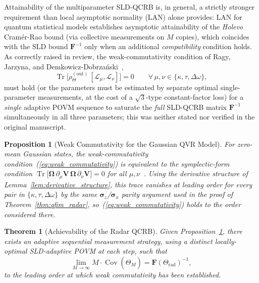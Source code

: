 \documentclass[journal]{IEEEtran}
\newtheorem{theorem}{Theorem}
\newtheorem{proposition}{Proposition}
\DeclareMathOperator{\Tr}{Tr}
\DeclareMathOperator{\Cov}{Cov}
\begin{document}
Attainability of the multiparameter SLD-QCRB is, in general, a strictly stronger requirement than local asymptotic normality (LAN) alone provides: LAN for quantum statistical models establishes asymptotic attainability of the \emph{Holevo} Cramér-Rao bound (via collective measurements on $M$ copies), which coincides with the SLD bound $\mathbf F^{-1}$ only when an additional \emph{compatibility} condition holds. As correctly raised in review, the weak-commutativity condition of Ragy, Jarzyna, and Demkowicz-Dobrza\'nski~\cite{ragy2016compatibility},
\begin{equation}\label{eq:weak_commutativity}
\Tr\!\big[\rho_\Theta^{(\text{out})}\,[\mathcal{L}_\mu,\mathcal{L}_\nu]\big] = 0 \qquad \forall\,\mu,\nu\in\{\kappa,\tau,\Delta\omega\},
\end{equation}
must hold (or the parameters must be estimated by separate optimal single-parameter measurements, at the cost of a $\sqrt{3}$-type constant-factor loss) for a \emph{single} adaptive POVM sequence to saturate the \emph{full} SLD-QCRB matrix $\mathbf F^{-1}$ simultaneously in all three parameters; this was neither stated nor verified in the original manuscript.

\begin{proposition}[Weak Commutativity for the Gaussian QVR Model]\label{prop:weak_comm}
For zero-mean Gaussian states, the weak-commutativity condition~(\ref{eq:weak_commutativity}) is equivalent to the symplectic-form condition $\Tr\!\big[\boldsymbol\Omega\,\partial_\mu\mathbf V\,\boldsymbol\Omega\,\partial_\nu\mathbf V\big]=0$ for all $\mu,\nu$~\cite{ragy2016compatibility,nichols2018multiparameter}. Using the derivative structure of Lemma~\ref{lem:derivative_structure}, this trace vanishes at leading order for every pair in $\{\kappa,\tau,\Delta\omega\}$ by the same $\boldsymbol\sigma_z$/$\boldsymbol\sigma_x$ parity argument used in the proof of Theorem~\ref{thm:qfim_radar}, so~(\ref{eq:weak_commutativity}) holds to the order considered there.
\end{proposition}

\begin{theorem}[Achievability of the Radar QCRB]\label{thm:achievability}
Given Proposition~\ref{prop:weak_comm}, there exists an adaptive sequential measurement strategy, using a distinct locally-optimal SLD-adaptive POVM at each step, such that
\begin{equation}\label{eq:achievability}
\lim_{M\to\infty} M \cdot \Cov(\hat{\Theta}_M) = \mathbf{F}(\Theta_{\text{rad}})^{-1},
\end{equation}
to the leading order at which weak commutativity has been established.
\end{theorem}
\end{document}
